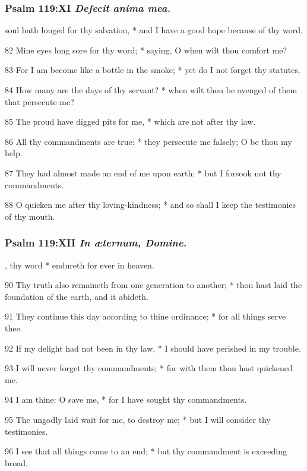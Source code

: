 \subsubsection{Psalm 119:XI \textit{Defecit anima mea.}}
 soul hath longed for thy salvation, * and I have a good hope because of thy word.
\par
    82 Mine eyes long sore for thy word; * saying, O when wilt thou comfort me?
\par
    83 For I am become like a bottle in the smoke; * yet do I not forget thy statutes.
\par
    84 How many are the days of thy servant? * when wilt thou be avenged of them that persecute me?
\par
    85 The proud have digged pits for me, * which are not after thy law.
\par
    86 All thy commandments are true: * they persecute me falsely; O be thou my help.
\par
    87 They had almost made an end of me upon earth; * but I forsook not thy commandments.
\par
    88 O quicken me after thy loving-kindness; * and so shall I keep the testimonies of thy mouth.
\subsubsection{Psalm 119:XII \textit{In {\ae}ternum, Domine.}}
, thy word * endureth for ever in heaven.
\par
    90 Thy truth also remaineth from one generation to another; * thou hast laid the foundation of the earth, and it abideth.
\par
    91 They continue this day according to thine ordinance; * for all things serve thee.
\par
    92 If my delight had not been in thy law, * I should have perished in my trouble.
\par
    93 I will never forget thy commandments; * for with them thou hast quickened me.
\par
    94 I am thine: O save me, * for I have sought thy commandments.
\par
    95 The ungodly laid wait for me, to destroy me; * but I will consider thy testimonies.
\par
    96 I see that all things come to an end; * but thy commandment is exceeding broad.
